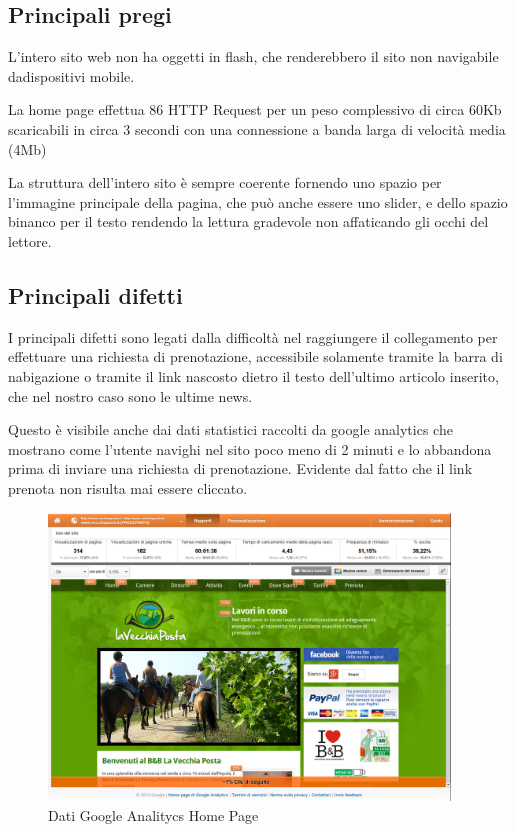 \documentclass[a4paper,12pt,hidelinks]{report}
\begin{document}
\subsection{Principali pregi}
  L'intero sito web non ha oggetti in flash, che renderebbero il sito non navigabile dadispositivi mobile.
  \par La home page effettua 86 HTTP Request per un peso complessivo di circa 60Kb scaricabili in circa 3 secondi con una connessione a banda larga di velocità media (4Mb)
  \par La struttura dell'intero sito è sempre coerente fornendo uno spazio per l'immagine principale della pagina, che può anche essere uno slider, 
  e dello spazio binanco per il testo rendendo la lettura gradevole non affaticando gli occhi del lettore.

\subsection{Principali difetti}
  I principali difetti sono legati dalla difficoltà nel raggiungere il collegamento per effettuare una richiesta di prenotazione, accessibile 
  solamente tramite la barra di nabigazione o tramite il link nascosto dietro il testo dell'ultimo articolo inserito, che nel nostro caso sono le ultime news.
  \par Questo è visibile anche dai dati statistici raccolti da google analytics che mostrano come l'utente navighi nel sito 
  poco meno di 2 minuti e lo abbandona prima di inviare una richiesta di prenotazione. Evidente dal fatto che il link prenota non risulta mai essere cliccato.
  \begin{figure}[h!]%
    \includegraphics[width=0.95\textwidth,keepaspectratio=true]{img/googleAnalyticsDoc1}
    \centering
    \caption{Dati Google Analitycs Home Page}%
    \label{fig:googleHomePage}%
  \end{figure}
\end{document}
